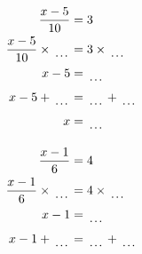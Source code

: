 \documentclass[12pt]{article}
\newcounter{minipagecount}
\begin{document}
\begin{multicols}{2}
\begin{minipage}[t]{0.45\textwidth}
    \raggedright %
    \begin{align*} %
        \frac{x - 5}{10} &= 3\\
        \frac{x - 5}{10} \times\dotuline{\hspace{5mm}} &= 3 \times\dotuline{\hspace{5mm}}\\
        x - 5 &= \dotuline{\hspace{5mm}}\\
        x - 5 + \dotuline{\hspace{5mm}} &= \dotuline{\hspace{5mm}} + \dotuline{\hspace{5mm}}\\
        x &= \dotuline{\hspace{5mm}}\\
    \end{align*}
\end{minipage} %
\noindent{(\theminipagecount)}\hspace{0.1mm} %
\begin{minipage}[t]{0.45\textwidth} %
    \vspace{-26pt}  %
    \raggedright %
    \begin{align*} %
        \frac{x - 1}{6} &= 4\\
        \frac{x - 1}{6} \times\dotuline{\hspace{5mm}} &= 4 \times\dotuline{\hspace{5mm}}\\
        x - 1 &= \dotuline{\hspace{5mm}}\\
        x - 1 + \dotuline{\hspace{5mm}} &= \dotuline{\hspace{5mm}} + \dotuline{\hspace{5mm}}\\

\end{align*}
\end{minipage}
\end{multicols}
\end{document}
